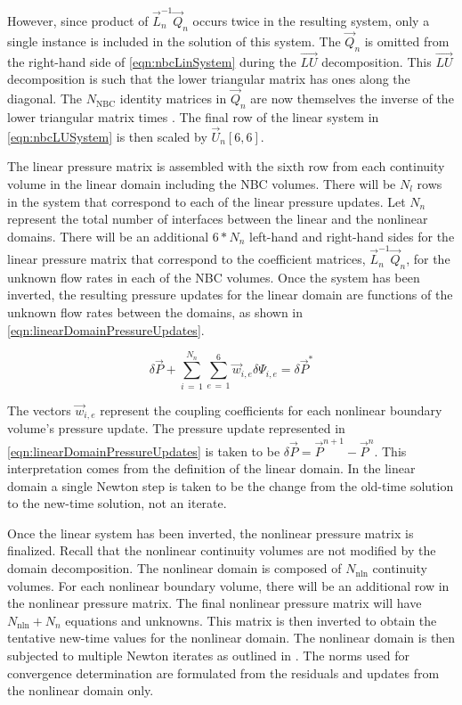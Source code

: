 However, since product of $\vec{L}_{n}^{-1}\vec{Q}_{n}$ occurs twice in the resulting system, only a single instance is included in the solution of this system.
The $\vec{Q}_{n}$ is omitted from the right-hand side of \eqref{eqn:nbcLinSystem} during the $\vec{LU}$ decomposition.
This $\vec{LU}$ decomposition is such that the lower triangular matrix has ones along the diagonal.
The $N_{\text{NBC}}$ identity matrices in $\vec{Q}_{n}$ are now themselves the inverse of the lower triangular matrix times \dt{}.
The final row of the linear system in \eqref{eqn:nbcLUSystem} is then scaled by $\vec{U}_{n}[6,6]$.

The linear pressure matrix is assembled with the sixth row from each continuity volume in the linear domain including the NBC volumes.
There will be $N_{l}$ rows in the system that correspond to each of the linear pressure updates.
Let $N_{n}$ represent the total number of interfaces between the linear and the nonlinear domains.
There will be an additional $6 * N_{n}$ left-hand and right-hand sides for the linear pressure matrix that correspond to the coefficient matrices, $\vec{L}^{-1}_{n}\vec{Q}_{n}$, for the unknown flow rates in each of the NBC volumes.
Once the system has been inverted, the resulting pressure updates for the linear domain are functions of the unknown flow rates between the domains, as shown in \eqref{eqn:linearDomainPressureUpdates}.

\begin{equation}
\label{eqn:linearDomainPressureUpdates}
\delta \vec{P} + \sum_{i\,=\,1}^{N_{n}} \sum_{e\,=\,1}^{6} \vec{w}_{i, e} \delta \Psi_{i, e} = \delta \vec{P}^{*} 
\end{equation}

The vectors $\vec{w}_{i, e}$ represent the coupling coefficients for each nonlinear boundary volume's pressure update.
The pressure update represented in \eqref{eqn:linearDomainPressureUpdates} is taken to be $\delta \vec{P} = \vec{P}^{n+1} - \vec{P}^{n}$.
This interpretation comes from the definition of the linear domain.
In the linear domain a single Newton step is taken to be the change from the old-time solution to the new-time solution, not an iterate.

Once the linear system has been inverted, the nonlinear pressure matrix is finalized.
Recall that the nonlinear continuity volumes are not modified by the domain decomposition.
The nonlinear domain is composed of $N_{\text{nln}}$ continuity volumes.
For each nonlinear boundary volume, there will be an additional row in the nonlinear pressure matrix.
The final nonlinear pressure matrix will have $N_{\text{nln}} + N_{n}$ equations and unknowns.
This matrix is then inverted to obtain the tentative new-time values for the nonlinear domain.
The nonlinear domain is then subjected to multiple Newton iterates as outlined in .
The norms used for convergence determination are formulated from the residuals and updates from the nonlinear domain only.

